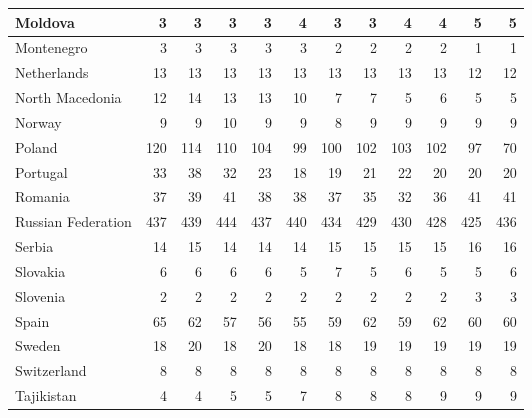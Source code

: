 \begin{table}
\begin{tabular}{|l|r|r|r|r|r|r|r|r|r|r|r|}
                       Moldova&      3&      3&      3&      3&      4&      3&      3&      4&      4&      5&      5\\\hline
                    Montenegro&      3&      3&      3&      3&      3&      2&      2&      2&      2&      1&      1\\\hline
                   Netherlands&     13&     13&     13&     13&     13&     13&     13&     13&     13&     12&     12\\\hline
               North Macedonia&     12&     14&     13&     13&     10&      7&      7&      5&      6&      5&      5\\\hline
                        Norway&      9&      9&     10&      9&      9&      8&      9&      9&      9&      9&      9\\\hline
                        Poland&    120&    114&    110&    104&     99&    100&    102&    103&    102&     97&     70\\\hline
                      Portugal&     33&     38&     32&     23&     18&     19&     21&     22&     20&     20&     20\\\hline
                       Romania&     37&     39&     41&     38&     38&     37&     35&     32&     36&     41&     41\\\hline
            Russian Federation&    437&    439&    444&    437&    440&    434&    429&    430&    428&    425&    436\\\hline
                        Serbia&     14&     15&     14&     14&     14&     15&     15&     15&     15&     16&     16\\\hline
                      Slovakia&      6&      6&      6&      6&      5&      7&      5&      6&      5&      5&      6\\\hline
                      Slovenia&      2&      2&      2&      2&      2&      2&      2&      2&      2&      3&      3\\\hline
                         Spain&     65&     62&     57&     56&     55&     59&     62&     59&     62&     60&     60\\\hline
                        Sweden&     18&     20&     18&     20&     18&     18&     19&     19&     19&     19&     19\\\hline
                   Switzerland&      8&      8&      8&      8&      8&      8&      8&      8&      8&      8&      8\\\hline
                    Tajikistan&      4&      4&      5&      5&      7&      8&      8&      8&      9&      9&      9\\\hline

\end{tabular}
\end{table}

